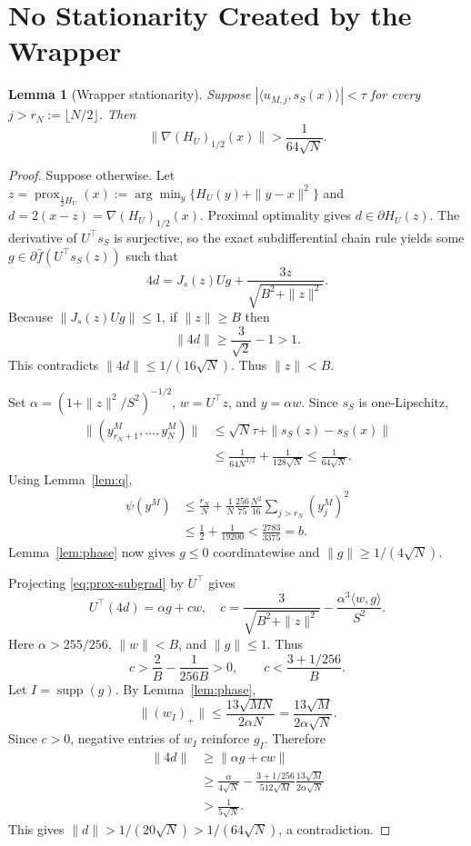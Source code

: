 \documentclass[twoside]{article}
\newtheorem{lemma}[theorem]{Lemma}
\newcommand{\prox}{\operatorname{prox}}
\newcommand{\supp}{\operatorname{supp}}
\begin{document}
\section{No Stationarity Created by the Wrapper}
\label{app:stationarity}

\begin{lemma}[Wrapper stationarity]
\label{lem:stationarity}
Suppose
$|\langle u_{M,j},s_S(x)\rangle|<\tau$ for every
$j>r_N:=\lfloor N/2\rfloor$. Then
\[
 \|\nabla(H_U)_{1/2}(x)\|>\frac1{64\sqrt N}.
\]
\end{lemma}

\begin{proof}
Suppose otherwise. Let
$z=\prox_{\frac12 H_U}(x):=\arg\min_y\{H_U(y)+\|y-x\|^2\}$ and
$d=2(x-z)=\nabla(H_U)_{1/2}(x)$. Proximal optimality gives
$d\in\partial H_U(z)$. The derivative of $U^\top s_S$ is surjective, so the
exact subdifferential chain rule yields some
$g\in\partial\bar f(U^\top s_S(z))$ such that
\begin{equation}
 4d=J_s(z)Ug+\frac{3z}{\sqrt{B^2+\|z\|^2}}.
 \label{eq:prox-subgrad}
\end{equation}
Because $\|J_s(z)Ug\|\leq1$, if $\|z\|\geq B$ then
\[
 \|4d\|\geq\frac3{\sqrt2}-1>1.
\]
This contradicts $\|4d\|\leq1/(16\sqrt N)$. Thus $\|z\|<B$.

Set $\alpha=(1+\|z\|^2/S^2)^{-1/2}$,
$w=U^\top z$, and $y=\alpha w$. Since $s_S$ is one-Lipschitz,
\begin{align*}
 \|(y^M_{r_N+1},\ldots,y^M_N)\|
 &\leq \sqrt N\tau+\|s_S(z)-s_S(x)\|\\
 &\leq\frac1{64N^{3/2}}+\frac1{128\sqrt N}
 \leq\frac1{64\sqrt N}.
\end{align*}
Using Lemma~\ref{lem:q},
\begin{align*}
 \psi(y^M)
 &\leq\frac{r_N}{N}
 +\frac1N\frac{256}{75}\frac{N^2}{16}
 \sum_{j>r_N}(y^M_j)^2\\
 &\leq\frac12+\frac1{19200}<\frac{2783}{3375}=b.
\end{align*}
Lemma~\ref{lem:phase} now gives $g\leq0$ coordinatewise and
$\|g\|\geq1/(4\sqrt N)$.

Projecting \eqref{eq:prox-subgrad} by $U^\top$ gives
\[
 U^\top(4d)=\alpha g+cw,
 \quad
 c=\frac3{\sqrt{B^2+\|z\|^2}}
 -\frac{\alpha^3\langle w,g\rangle}{S^2}.
\]
Here $\alpha>255/256$, $\|w\|<B$, and $\|g\|\leq1$. Thus
\[
 c>\frac{2}{B}-\frac1{256B}>0,
 \qquad c<\frac{3+1/256}{B}.
\]
Let $I=\supp(g)$. By Lemma~\ref{lem:phase},
\[
 \|(w_I)_+\|\leq\frac{13\sqrt{MN}}{2\alpha N}
 =\frac{13\sqrt M}{2\alpha\sqrt N}.
\]
Since $c>0$, negative entries of $w_I$ reinforce $g_I$. Therefore
\begin{align*}
 \|4d\|&\geq\|\alpha g+cw\|\\
 &\geq\frac{\alpha}{4\sqrt N}
 -\frac{3+1/256}{512\sqrt M}
 \frac{13\sqrt M}{2\alpha\sqrt N}\\
 &>\frac1{5\sqrt N}.
\end{align*}
This gives $\|d\|>1/(20\sqrt N)>1/(64\sqrt N)$, a contradiction.
\end{proof}
\end{document}
